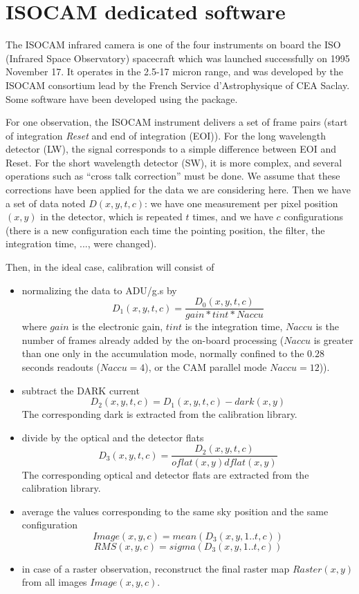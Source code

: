 \chapter{ISOCAM dedicated software}
\label{ch_iso}

The ISOCAM infrared camera is one of the four instruments on board the ISO 
(Infrared Space Observatory) spacecraft which was launched successfully
on 1995 November 17. It operates in the 2.5-17 micron range, and was 
developed by the ISOCAM consortium lead by the French Service d'Astrophysique of 
CEA Saclay.  
Some software have been developed using the \proj package.

For one observation, the ISOCAM instrument delivers a set of frame pairs (start of 
integration {\em Reset} and end of integration (EOI)). For the 
long wavelength detector (LW), the signal corresponds  to a simple difference 
between EOI and Reset. For the short wavelength detector (SW), it is more complex, 
and several operations such as  ``cross
talk correction'' must be done. We assume that these corrections have been
applied for the data we are considering here. Then we have a set of data  noted 
$D(x,y,t,c)$: we
have one measurement per pixel position $(x,y)$ in the detector, which is repeated 
$t$ times,
and we have $c$ configurations (there is a new configuration each time the 
pointing position,
the filter, the integration time, ..., were changed).

Then, in the ideal case, calibration will consist of \cite{starck:sta98_4}
\begin{itemize}
\item normalizing the data to ADU/g.s by 
\[ D_1(x,y,t,c) = \frac{D_0(x,y,t,c)}{gain*tint*Naccu} \]
where $gain$ is the electronic gain, $tint$ is the integration time, $Naccu$ is 
the number of
frames already added  by the on-board processing ($Naccu$ is greater than one only 
in the accumulation mode, normally confined to the $0.28$ seconds readouts 
($Naccu=4$), 
or the CAM parallel mode $Naccu=12$)). 
\item subtract the DARK current  
\[ D_2(x,y,t,c) = D_1(x,y,t,c) - dark(x,y) \]
The corresponding dark is extracted from the calibration library.
\item divide by the optical and the detector flats
\[ D_3(x,y,t,c) = \frac{D_2(x,y,t,c)}{oflat(x,y)dflat(x,y)} \]
The corresponding optical and detector flats are extracted from the calibration 
library.
\item average the values corresponding to the same sky position and the same 
configuration
\[ Image(x,y,c) = mean(D_3(x,y,1..t,c)) \]
\[ RMS(x,y,c) =  sigma(D_3(x,y,1..t,c)) \]
\item in case of a raster observation, reconstruct the final raster map 
$Raster(x,y)$ from all images $Image(x,y,c)$.
\end{itemize}

